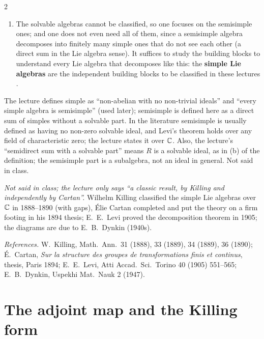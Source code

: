 \begin{paracol}{2}
\begin{enumerate}
  \item[(d)] The solvable algebras cannot be classified, so one focuses on the semisimple ones; and one does not even need all of them, since a semisimple algebra decomposes into finitely many simple ones that do not see each other (a direct sum in the Lie algebra sense). It suffices to study the building blocks to understand every Lie algebra that decomposes like this: the \textbf{simple Lie algebras} are the independent building blocks to be classified in these lectures    .
\end{enumerate}
\begin{coursenote}
The lecture defines simple as ``non-abelian with no non-trivial ideals'' and ``every simple algebra is semisimple'' (used later); semisimple is defined here as a direct sum of simples without a solvable part. In the literature semisimple is usually defined as having no non-zero solvable ideal, and Levi's theorem holds over any field of characteristic zero; the lecture states it over $\mathbb{C}$. Also, the lecture's ``semidirect sum with a solvable part'' means $R$ is a solvable ideal, as in (b) of the definition; the semisimple part is a subalgebra, not an ideal in general. Not said in class. 
\end{coursenote}
\begin{history}
\emph{Not said in class; the lecture only says ``a classic result, by Killing and independently by Cartan''.} Wilhelm Killing classified the simple Lie algebras over $\mathbb{C}$ in 1888--1890 (with gaps), \'Elie Cartan completed and put the theory on a firm footing in his 1894 thesis; E.~E.~Levi proved the decomposition theorem in 1905; the diagrams are due to E.~B.~Dynkin (1940s).\par
\smallskip
\emph{References.} W.~Killing, Math.\ Ann.\ 31 (1888), 33 (1889), 34 (1889), 36 (1890); \'E.~Cartan, \emph{Sur la structure des groupes de transformations finis et continus}, thesis, Paris 1894; E.~E.~Levi, Atti Accad.\ Sci.\ Torino 40 (1905) 551--565; E.~B.~Dynkin, Uspekhi Mat.\ Nauk 2 (1947).
\end{history}

\section{The adjoint map and the Killing form}\label{sec:cl-killing}


\end{paracol}
